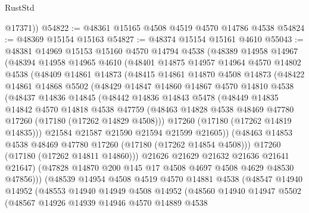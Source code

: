 \begin{lexlean}{RustStd}
\begin{coremodule}
{\begin{coremodule}
{{{{{{{{{{{{{{{{{{{{{{{{{{{{{{{{{{{{{{{{{{{{{{{{{{{{{{{        @17371))
@54822 := @48361 @15165 @4508 @4519 @4570 @14786 @4538
@54824 := @48369 @15154 @15163
@54827 := @48374 @15154 @15161 @4610
@55043 := @48381
    @14969
    @15153
    @15160
    @4570
    @14794
    @4538
    (@48389
      @14958
      @14967
      (@48394
        @14958
        @14965
        @4610
        (@48401
          @14875
          @14957
          @14964
          @4570
          @14802
          @4538
          (@48409
            @14861
            @14873
            (@48415
              @14861
              @14870
              @4508
              @14873
              (@48422
                @14861
                @14868
                @5502
                (@48429
                  @14847
                  @14860
                  @14867
                  @4570
                  @14810
                  @4538
                  (@48437
                    @14836
                    @14845
                    (@48442
                      @14836
                      @14843
                      @5478
                      (@48449
                        @14835
                        @14842
                        @4570
                        @14818
                        @4538
                        @47759
                        (@48463 @14828 @4538 @48469 @47780 @17260 (@17180 (@17262 @14829 @4508)))
                        @17260
                        (@17180 (@17262 @14819 @14835)))
                      @21584
                      @21587
                      @21590
                      @21594
                      @21599
                      @21605))
                  (@48463 @14853 @4538 @48469 @47780 @17260 (@17180 (@17262 @14854 @4508)))
                  @17260
                  (@17180 (@17262 @14811 @14860)))
                @21626
                @21629
                @21632
                @21636
                @21641
                @21647)
              (@47828 @14870 @200 @145 @17 @4508 @4697 @4508 @4629 @48530 @47856)))
          (@48539
            @14954
            @4508
            @4519
            @4570
            @14881
            @4538
            (@48547
              @14940
              @14952
              (@48553
                @14940
                @14949
                @4508
                @14952
                (@48560
                  @14940
                  @14947
                  @5502
                  (@48567
                    @14926
                    @14939
                    @14946
                    @4570
                    @14889
                    @4538
}}}}}}}}}}}}}}}}}}}}}}}}}}}}}}}}}}}}}}}}}}}}}}}}}}}}}}}
\end{coremodule}}
\end{coremodule}
\end{lexlean}
